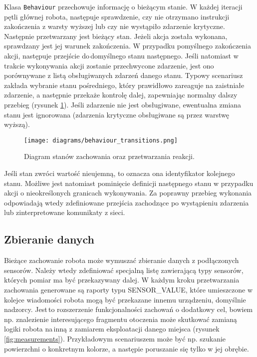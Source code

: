 Klasa {\tt Behaviour} przechowuje informację o bieżącym stanie. W każdej iteracji pętli głównej robota, następuje sprawdzenie, czy nie otrzymano instrukcji zakończenia z warsty wyższej lub czy nie wystąpiło zdarzenie krytyczne. Następnie przetwarzany jest bieżący stan. Jeżeli akcja została wykonana, sprawdzany jest jej warunek zakończenia. W przypadku pomyślnego zakończenia akcji, następuje przejście do\,domyślnego stanu następnego. Jeśli natomiast w trakcie wykonywania akcji zostanie przechwycone zdarzenie, jest ono porównywane z listą obsługiwanych zdarzeń danego stanu. Typowy scenariusz zakłada wybranie stanu pośredniego, który prawidłowo zareaguje na zaistniałe zdarzenie, a następnie przekaże kontrolę dalej, zapewniając normalny dalszy przebieg (rysunek \ref{fig:behaviour_transitions}). Jeśli zdarzenie nie jest obsługiwane, ewentualna zmiana stanu jest ignorowana (zdarzenia krytyczne obsługiwane są przez warstwę wyższą).

\begin{figure}[!ht]
    \centering
        \texttt{[image: diagrams/behaviour\_transitions.png]}
    \caption{Diagram stanów zachowania oraz przetwarzania reakcji.\label{fig:behaviour_transitions}}
\end{figure}

Jeśli stan zwróci wartość nieujemną, to oznacza ona identyfikator kolejnego stanu. Możliwe jest natomiast pominięcie definicji następnego stanu w przypadku akcji o nieokreślonych granicach wykonywania. Za poprawny przebieg wykonania odpowiadają wtedy zdefiniowane przejścia zachodzące po wystąpieniu zdarzenia lub zinterpretowane komunikaty z sieci.

\subsection{Zbieranie danych}

Bieżące zachowanie robota może wymuszać zbieranie danych z podłączonych sensorów. Należy wtedy zdefiniować specjalną listę zawierającą typy sensorów, których pomiar ma być przekazywany dalej. W każdym kroku przetwarzania zachowania generowane są raporty typu SENSOR\_VALUE, które umieszczone w kolejce wiadomości robota mogą być przekazane innemu urządzeniu, domyślnie nadzorcy. Jest\,to rozszerzenie funkcjonalności zachowań o dodatkowy cel, bowiem np. znalezienie interesującego fragmentu otoczenia może skutkować zamianą logiki robota na\,inną z zamiarem eksploatacji danego miejsca (rysunek \ref{fig:measurements}). Przykładowym scenariuszem może być np. szukanie powierzchni o konkretnym kolorze, a następie poruszanie się tylko w jej obrębie.

